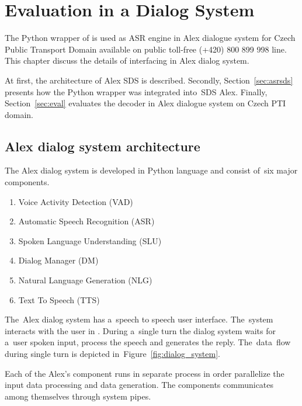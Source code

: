 \chapter{Evaluation in a Dialog System}
\label{cha:integration}



The Python wrapper of  is used as \ac{ASR} engine in Alex dialogue system for Czech Public Transport Domain available on public toll-free (+420) 800 899 998 line.
This chapter discuss the details of interfacing  in Alex dialog system.

At first, the architecture of Alex \ac{SDS} is described.
Secondly, Section~\ref{sec:asrsds} presents how the Python wrapper  was integrated into~\ac{SDS} Alex.
Finally, Section~\ref{sec:eval} evaluates the decoder in Alex dialogue system on Czech \ac{PTI} domain. 



\section{Alex dialog system architecture} 
\label{sec:arch}
The Alex dialog system is developed in Python language and consist of~six major components. 
\begin{enumerate}
    \item Voice Activity Detection (VAD)
    \item Automatic Speech Recognition (ASR) 
    \item Spoken Language Understanding (SLU)
    \item Dialog Manager (DM)
    \item Natural Language Generation (NLG)
    \item Text To Speech (TTS)
\end{enumerate}
The~Alex dialog system has a~speech to speech user interface. 
The~system interacts with the user in . 
During a~single turn the dialog system waits for a~user spoken input, process the speech and generates the reply.
The~data~flow during single turn is depicted in~Figure~\ref{fig:dialog_system}.

Each of the Alex's component runs in separate process in order parallelize the input data processing and data generation.
The components communicates among themselves through system pipes.


